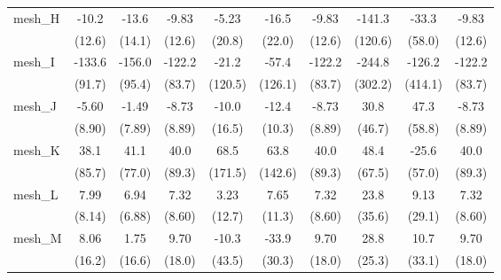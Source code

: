 \begin{tabular}{lccccccccc}
   mesh\_H                                                     & -10.2         & -13.6         & -9.83         & -5.23        & -16.5        & -9.83         & -141.3       & -33.3   & -9.83\\   
                                                               & (12.6)        & (14.1)        & (12.6)        & (20.8)       & (22.0)       & (12.6)        & (120.6)      & (58.0)  & (12.6)\\   
   mesh\_I                                                     & -133.6        & -156.0        & -122.2        & -21.2        & -57.4        & -122.2        & -244.8       & -126.2  & -122.2\\   
                                                               & (91.7)        & (95.4)        & (83.7)        & (120.5)      & (126.1)      & (83.7)        & (302.2)      & (414.1) & (83.7)\\   
   mesh\_J                                                     & -5.60         & -1.49         & -8.73         & -10.0        & -12.4        & -8.73         & 30.8         & 47.3    & -8.73\\   
                                                               & (8.90)        & (7.89)        & (8.89)        & (16.5)       & (10.3)       & (8.89)        & (46.7)       & (58.8)  & (8.89)\\   
   mesh\_K                                                     & 38.1          & 41.1          & 40.0          & 68.5         & 63.8         & 40.0          & 48.4         & -25.6   & 40.0\\   
                                                               & (85.7)        & (77.0)        & (89.3)        & (171.5)      & (142.6)      & (89.3)        & (67.5)       & (57.0)  & (89.3)\\   
   mesh\_L                                                     & 7.99          & 6.94          & 7.32          & 3.23         & 7.65         & 7.32          & 23.8         & 9.13    & 7.32\\   
                                                               & (8.14)        & (6.88)        & (8.60)        & (12.7)       & (11.3)       & (8.60)        & (35.6)       & (29.1)  & (8.60)\\   
   mesh\_M                                                     & 8.06          & 1.75          & 9.70          & -10.3        & -33.9        & 9.70          & 28.8         & 10.7    & 9.70\\   
                                                               & (16.2)        & (16.6)        & (18.0)        & (43.5)       & (30.3)       & (18.0)        & (25.3)       & (33.1)  & (18.0)\\   

\end{tabular}
